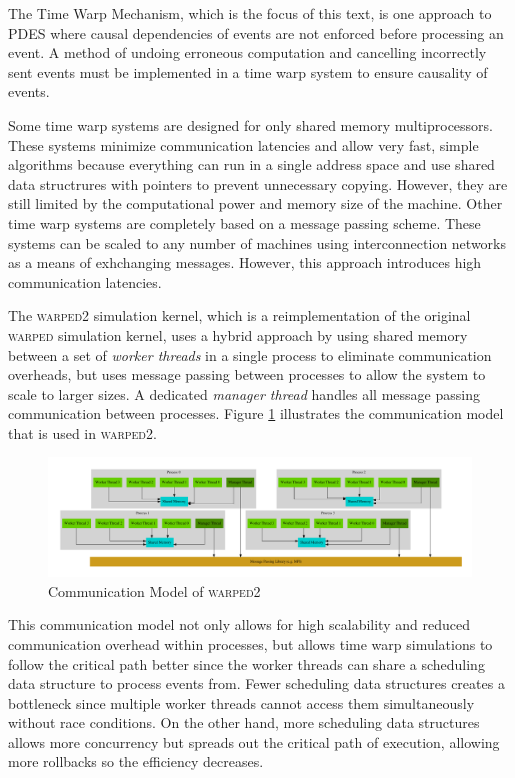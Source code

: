 \documentclass[11pt]{book}
\begin{document}
The Time Warp Mechanism\cite{jefferson-85}, which is the focus of this text, is one approach
to PDES where causal dependencies of events are not enforced before processing an event. A method
of undoing erroneous computation and cancelling incorrectly sent events must be implemented in
a time warp system to ensure causality of events.

Some time warp systems are designed for only shared memory multiprocessors. These systems
minimize communication latencies and allow very fast, simple algorithms because everything
can run in a single address space and use shared data structrures with pointers to prevent
unnecessary copying. However, they are still limited by the computational power and memory
size of the machine. Other time warp systems are completely based on a message passing scheme.
These systems can be scaled to any number of machines using interconnection networks as a means
of exhchanging messages. However, this approach introduces high communication latencies.

The \textsc{warped2} simulation kernel, which is a reimplementation of the original
\textsc{warped} simulation kernel, uses a hybrid approach by using shared memory between a set
of \emph{worker threads} in a single process to eliminate communication overheads, but uses
message passing between processes to allow the system to scale to larger sizes. A dedicated
\emph{manager thread} handles all message passing communication between processes.
Figure \ref{warped2_communication} illustrates the communication model that is
used in \textsc{warped2}.

\begin{figure}[H]
    \centering
    \includegraphics[width=\textwidth,quiet]{figs/graphviz/warped_communication.pdf}
    \caption{Communication Model of \textsc{warped2}}\label{warped2_communication}
\end{figure}

\noindent
This communication model not only allows for high scalability and reduced communication
overhead within processes, but allows time warp simulations to follow the critical path better
since the worker threads can share a scheduling data structure to process events from.
Fewer scheduling data structures creates a bottleneck since multiple worker threads cannot
access them simultaneously without race conditions. On the other hand, more scheduling
data structures allows more concurrency but spreads out the critical path of execution,
allowing more rollbacks so the efficiency decreases.
\end{document}
